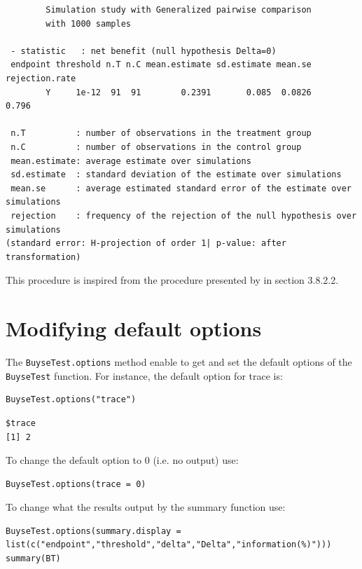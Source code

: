 \documentclass[12pt]{article}
\begin{document}
\begin{verbatim}
        Simulation study with Generalized pairwise comparison
        with 1000 samples

 - statistic   : net benefit (null hypothesis Delta=0)
 endpoint threshold n.T n.C mean.estimate sd.estimate mean.se rejection.rate
        Y     1e-12  91  91        0.2391       0.085  0.0826          0.796

 n.T          : number of observations in the treatment group
 n.C          : number of observations in the control group
 mean.estimate: average estimate over simulations
 sd.estimate  : standard deviation of the estimate over simulations
 mean.se      : average estimated standard error of the estimate over simulations
 rejection    : frequency of the rejection of the null hypothesis over simulations
(standard error: H-projection of order 1| p-value: after transformation)
\end{verbatim}
This procedure is inspired from the procedure presented by
\cite{brunner2018rank} in section 3.8.2.2.


\clearpage

\section{Modifying default options}
\label{sec:org01b58ee}
The \texttt{BuyseTest.options} method enable to get and set the default
options of the \texttt{BuyseTest} function. For instance, the default option
for trace is:
\lstset{language=r,label= ,caption= ,captionpos=b,numbers=none}
\begin{lstlisting}
BuyseTest.options("trace")
\end{lstlisting}

\begin{verbatim}
$trace
[1] 2
\end{verbatim}


To change the default option to 0 (i.e. no output) use:
\lstset{language=r,label= ,caption= ,captionpos=b,numbers=none}
\begin{lstlisting}
BuyseTest.options(trace = 0)
\end{lstlisting}

To change what the results output by the summary function use:
\lstset{language=r,label= ,caption= ,captionpos=b,numbers=none}
\begin{lstlisting}
BuyseTest.options(summary.display = list(c("endpoint","threshold","delta","Delta","information(%)")))
summary(BT)
\end{lstlisting}
\end{document}
